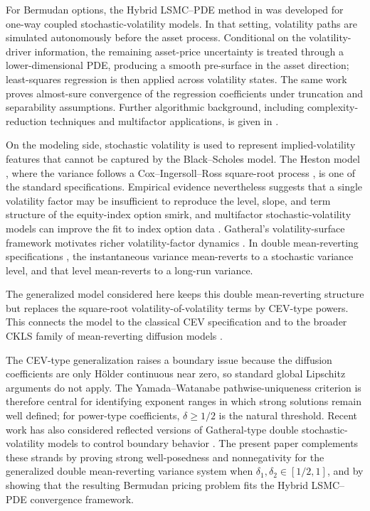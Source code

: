 \documentclass[pdflatex,sn-mathphys-num]{sn-jnl}
\theoremstyle{thmstyleone}%
\theoremstyle{thmstylethree}%
\theoremstyle{thmstyletwo}%
\begin{document}
For Bermudan options, the Hybrid LSMC--PDE method in \cite{farahany2020mixing} was developed for one-way coupled stochastic-volatility models. In that setting, volatility paths are simulated autonomously before the asset process. Conditional on the volatility-driver information, the remaining asset-price uncertainty is treated through a lower-dimensional PDE, producing a smooth pre-surface in the asset direction; least-squares regression is then applied across volatility states. The same work proves almost-sure convergence of the regression coefficients under truncation and separability assumptions. Further algorithmic background, including complexity-reduction techniques and multifactor applications, is given in \cite{farahany2019thesis}.

On the modeling side, stochastic volatility is used to represent implied-volatility features that cannot be captured by the Black--Scholes model. The Heston model \citep{heston1993closedform}, where the variance follows a Cox--Ingersoll--Ross square-root process \citep{cir1985termstructure}, is one of the standard specifications. Empirical evidence nevertheless suggests that a single volatility factor may be insufficient to reproduce the level, slope, and term structure of the equity-index option smirk, and multifactor stochastic-volatility models can improve the fit to index option data \cite{christoffersen2009smirk}. Gatheral's volatility-surface framework motivates richer volatility-factor dynamics \citep{gatheral2006volsurface}. In double mean-reverting specifications \citep{bayer2013fast}, the instantaneous variance mean-reverts to a stochastic variance level, and that level mean-reverts to a long-run variance.

The generalized model considered here keeps this double mean-reverting structure but replaces the square-root volatility-of-volatility terms by CEV-type powers. This connects the model to the classical CEV specification \citep{cox1975cev} and to the broader CKLS family of mean-reverting diffusion models \citep{chan1992empirical}.

The CEV-type generalization raises a boundary issue because the diffusion coefficients are only H\"older continuous near zero, so standard global Lipschitz arguments do not apply. The Yamada--Watanabe pathwise-uniqueness criterion \cite{yamada1971uniqueness} is therefore central for identifying exponent ranges in which strong solutions remain well defined; for power-type coefficients, $\delta\ge 1/2$ is the natural threshold. Recent work has also considered reflected versions of Gatheral-type double stochastic-volatility models to control boundary behavior \citep{mishura2025skorokhod}. The present paper complements these strands by proving strong well-posedness and nonnegativity for the generalized double mean-reverting variance system when $\delta_1,\delta_2\in[1/2,1]$, and by showing that the resulting Bermudan pricing problem fits the Hybrid LSMC--PDE convergence framework.
\end{document}
